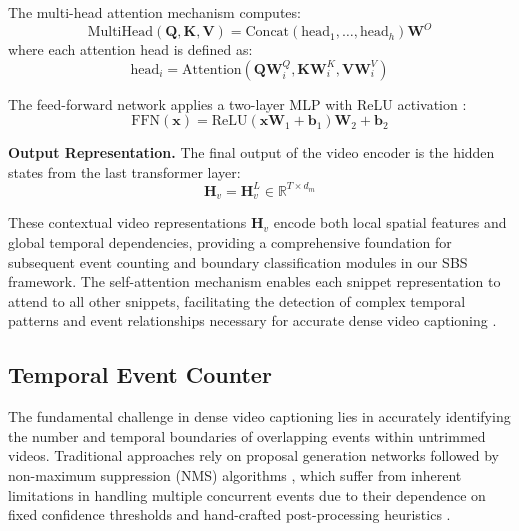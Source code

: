 The multi-head attention mechanism computes:
\begin{equation}
  \text{MultiHead}(\mathbf{Q}, \mathbf{K}, \mathbf{V}) = \text{Concat}(\text{head}_1, \ldots, \text{head}_h) \mathbf{W}^O
  \label{eq:multihead_attention}
\end{equation}
where each attention head is defined as:
\begin{equation}
  \text{head}_i = \text{Attention}(\mathbf{Q}\mathbf{W}_i^Q, \mathbf{K}\mathbf{W}_i^K, \mathbf{V}\mathbf{W}_i^V)
  \label{eq:attention_head}
\end{equation}

The feed-forward network applies a two-layer MLP with ReLU activation \cite{He2016-qc}:
\begin{equation}
  \text{FFN}(\mathbf{x}) = \text{ReLU} \left(\mathbf{x}\mathbf{W}_1 + \mathbf{b}_1 \right)\mathbf{W}_2 + \mathbf{b}_2
  \label{eq:feed_forward_network}
\end{equation}

\textbf{Output Representation.}
The final output of the video encoder is the hidden states from the last transformer layer:
\begin{equation}
  \mathbf{H}_v = \mathbf{H}_v^L \in \mathbb{R}^{T \times d_m}
  \label{eq:final_video_representation}
\end{equation}

These contextual video representations $\mathbf{H}_v$ encode both local spatial features and global temporal dependencies, providing a comprehensive foundation for subsequent event counting and boundary classification modules in our SBS framework. The self-attention mechanism enables each snippet representation to attend to all other snippets, facilitating the detection of complex temporal patterns and event relationships necessary for accurate dense video captioning \cite{Zhou2018-zu,Wang2021-zi}.


\subsection{Temporal Event Counter}
\label{subsec:method_temporal_event_counter}

The fundamental challenge in dense video captioning lies in accurately identifying the number and temporal boundaries of overlapping events within untrimmed videos. Traditional approaches rely on proposal generation networks followed by non-maximum suppression (NMS) algorithms \cite{Krishna2017-pw,Li2018-ll}, which suffer from inherent limitations in handling multiple concurrent events due to their dependence on fixed confidence thresholds and hand-crafted post-processing heuristics \cite{hosang2017learning,lin2018bsn}.

